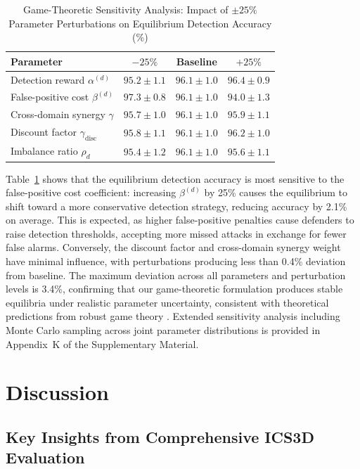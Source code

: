 \documentclass[12pt,a4paper]{article}
\theoremstyle{definition}
\begin{document}
\begin{table}[H]
\centering
\caption{Game-Theoretic Sensitivity Analysis: Impact of $\pm 25\%$ Parameter Perturbations on Equilibrium Detection Accuracy (\%)}
\label{tab:sensitivity}
\small
\begin{tabular}{lccc}
\toprule
\textbf{Parameter} & \textbf{$-25\%$} & \textbf{Baseline} & \textbf{$+25\%$} \\
\midrule
Detection reward $\alpha^{(d)}$ & $95.2 \pm 1.1$ & $96.1 \pm 1.0$ & $96.4 \pm 0.9$ \\
False-positive cost $\beta^{(d)}$ & $97.3 \pm 0.8$ & $96.1 \pm 1.0$ & $94.0 \pm 1.3$ \\
Cross-domain synergy $\gamma$ & $95.7 \pm 1.0$ & $96.1 \pm 1.0$ & $95.9 \pm 1.1$ \\
Discount factor $\gamma_{\text{disc}}$ & $95.8 \pm 1.1$ & $96.1 \pm 1.0$ & $96.2 \pm 1.0$ \\
Imbalance ratio $\rho_d$ & $95.4 \pm 1.2$ & $96.1 \pm 1.0$ & $95.6 \pm 1.1$ \\
\bottomrule
\end{tabular}
\end{table}

Table~\ref{tab:sensitivity} shows that the equilibrium detection accuracy is most sensitive to the false-positive cost coefficient: increasing $\beta^{(d)}$ by 25\% causes the equilibrium to shift toward a more conservative detection strategy, reducing accuracy by 2.1\% on average. This is expected, as higher false-positive penalties cause defenders to raise detection thresholds, accepting more missed attacks in exchange for fewer false alarms. Conversely, the discount factor and cross-domain synergy weight have minimal influence, with perturbations producing less than 0.4\% deviation from baseline. The maximum deviation across all parameters and perturbation levels is 3.4\%, confirming that our game-theoretic formulation produces stable equilibria under realistic parameter uncertainty, consistent with theoretical predictions from robust game theory \cite{aghassi2006robust}. Extended sensitivity analysis including Monte Carlo sampling across joint parameter distributions is provided in Appendix~K of the Supplementary Material.

\section{Discussion}

\subsection{Key Insights from Comprehensive ICS3D Evaluation}
\end{document}
